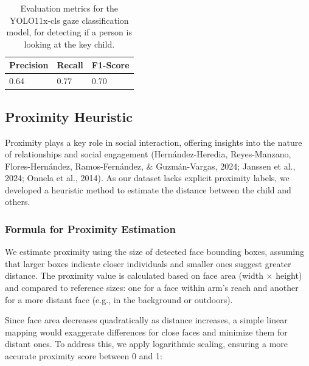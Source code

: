 \documentclass[
  man,floatsintext]{apa6}
\begin{document}
\begin{table}[tbp]

\begin{center}
\begin{threeparttable}

\caption{\label{tab:gaze-metrics-short}Evaluation metrics for the YOLO11x-cls gaze classification model, for detecting if a person is looking at the key child.}

\begin{tabular}{lll}
\toprule
Precision & \multicolumn{1}{c}{Recall} & \multicolumn{1}{c}{F1-Score}\\
\midrule
0.64 & 0.77 & 0.70\\
\bottomrule
\end{tabular}

\end{threeparttable}
\end{center}

\end{table}

\subsection{Proximity Heuristic}\label{proximity-heuristic}

Proximity plays a key role in social interaction, offering insights into the nature of relationships and social engagement (Hernández-Heredia, Reyes-Manzano, Flores-Hernández, Ramos-Fernández, \& Guzmán-Vargas, 2024; Janssen et al., 2024; Onnela et al., 2014). As our dataset lacks explicit proximity labels, we developed a heuristic method to estimate the distance between the child and others.

\subsubsection{Formula for Proximity Estimation}\label{formula-for-proximity-estimation}

We estimate proximity using the size of detected face bounding boxes, assuming that larger boxes indicate closer individuals and smaller ones suggest greater distance. The proximity value is calculated based on face area (width × height) and compared to reference sizes: one for a face within arm's reach and another for a more distant face (e.g., in the background or outdoors).

Since face area decreases quadratically as distance increases, a simple linear mapping would exaggerate differences for close faces and minimize them for distant ones. To address this, we apply logarithmic scaling, ensuring a more accurate proximity score between 0 and 1:
\end{document}
